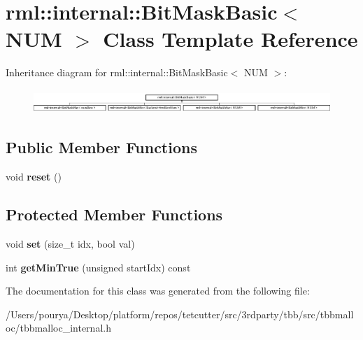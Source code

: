 \hypertarget{classrml_1_1internal_1_1BitMaskBasic}{}\section{rml\+:\+:internal\+:\+:Bit\+Mask\+Basic$<$ N\+U\+M $>$ Class Template Reference}
\label{classrml_1_1internal_1_1BitMaskBasic}
Inheritance diagram for rml\+:\+:internal\+:\+:Bit\+Mask\+Basic$<$ N\+U\+M $>$\+:\begin{figure}[H]
\begin{center}
\leavevmode
\includegraphics[height=0.912052cm]{classrml_1_1internal_1_1BitMaskBasic}
\end{center}
\end{figure}
\subsection*{Public Member Functions}
\begin{DoxyCompactItemize}
\item 
\hypertarget{classrml_1_1internal_1_1BitMaskBasic_abb3861e0f501fc8a8fed2ff47c76a270}{}void {\bfseries reset} ()\label{classrml_1_1internal_1_1BitMaskBasic_abb3861e0f501fc8a8fed2ff47c76a270}

\end{DoxyCompactItemize}
\subsection*{Protected Member Functions}
\begin{DoxyCompactItemize}
\item 
\hypertarget{classrml_1_1internal_1_1BitMaskBasic_a722a4fa1506daf7887ece1e8e495d5ff}{}void {\bfseries set} (size\+\_\+t idx, bool val)\label{classrml_1_1internal_1_1BitMaskBasic_a722a4fa1506daf7887ece1e8e495d5ff}

\item 
\hypertarget{classrml_1_1internal_1_1BitMaskBasic_abfe2d0d9da3aeb31d12de88242a707cc}{}int {\bfseries get\+Min\+True} (unsigned start\+Idx) const \label{classrml_1_1internal_1_1BitMaskBasic_abfe2d0d9da3aeb31d12de88242a707cc}

\end{DoxyCompactItemize}


The documentation for this class was generated from the following file\+:\begin{DoxyCompactItemize}
\item 
/\+Users/pourya/\+Desktop/platform/repos/tetcutter/src/3rdparty/tbb/src/tbbmalloc/tbbmalloc\+\_\+internal.\+h\end{DoxyCompactItemize}
